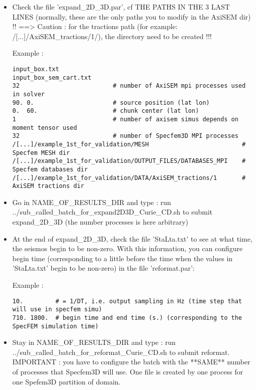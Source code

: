 \documentclass[11pt]{article}
\begin{document}
\begin{itemize}

\item[\textbullet] {\color{red} Check the file 'expand\_2D\_3D.par', cf THE PATHS IN THE 3 LAST LINES (normally, these are the only paths you to modify in the AxiSEM dir) !!} ==> Caution : for the tractions path (for example: /[...]/AxiSEM\_tractions/1/), the directory need to be created !!!

\smallskip

\noindent Example :
\begin{verbatim}
input_box.txt
input_box_sem_cart.txt
32                          # number of AxiSEM mpi processes used in solver
90. 0.                      # source position (lat lon)
0.  60.                     # chunk center (lat lon)
1                           # number of axisem simus depends on moment tensor used
32                          # number of Specfem3D MPI processes
/[...]/example_1st_for_validation/MESH                          # Specfem MESH dir
/[...]/example_1st_for_validation/OUTPUT_FILES/DATABASES_MPI    # Specfem databases dir
/[...]/example_1st_for_validation/DATA/AxiSEM_tractions/1       # AxiSEM tractions dir
\end{verbatim}

\item[\textbullet] Go in NAME\_OF\_RESULTS\_DIR and type : run ../sub\_called\_batch\_for\_expand2D3D\_Curie\_CD.sh to submit expand\_2D\_3D (the number processes is here arbitrary)

\item[\textbullet] At the end of expand\_2D\_3D, check the file 'StaLta.txt' to see at what time, the seismos begin to be non-zero. With this information, you can {\color{red} configure} begin time (corresponding to a little before the time when the values in 'StaLta.txt' begin to be non-zero) {\color{red} in the file 'reformat.par'}:

\smallskip

\noindent Example :
\begin{verbatim}
10.         # = 1/DT, i.e. output sampling in Hz (time step that will use in specfem simu)
710. 1800.  # begin time and end time (s.) (corresponding to the SpecFEM simulation time)
\end{verbatim}

\item[\textbullet] Stay in NAME\_OF\_RESULTS\_DIR and type : run ../sub\_called\_batch\_for\_reformat\_Curie\_CD.sh to submit reformat. IMPORTANT : you have to configure the batch with the **SAME** number of processes that Specfem3D will use. One file is created by one process for one Spefem3D partition of domain.

\end{itemize}
\end{document}
